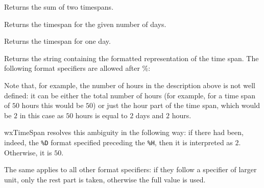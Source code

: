 

Returns the sum of two timespans.


\label{wxtimespandays}


Returns the timespan for the given number of days.


\label{wxtimespanday}


Returns the timespan for one day.


\label{wxtimespanformat}


Returns the string containing the formatted representation of the time span.
The following format specifiers are allowed after \%:

\twocolwidtha{5cm}%
\begin{twocollist}\itemsep=0pt
\end{twocollist}

Note that, for example, the number of hours in the description above is not
well defined: it can be either the total number of hours (for example, for a
time span of $50$ hours this would be $50$) or just the hour part of the time
span, which would be $2$ in this case as $50$ hours is equal to $2$ days and
$2$ hours.

wxTimeSpan resolves this ambiguity in the following way: if there had been,
indeed, the {\tt \%D} format specified preceding the {\tt \%H}, then it is
interpreted as $2$. Otherwise, it is $50$.

The same applies to all other format specifiers: if they follow a specifier of
larger unit, only the rest part is taken, otherwise the full value is used.


\label{wxtimespangetdays}


